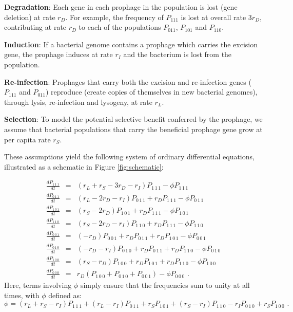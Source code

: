 {\bf Degradation}:  Each gene in each prophage in the population is lost (gene deletion) at rate $r_{D}$. For example, the frequency of $P_{111}$ is lost at overall rate $3r_D$, contributing at rate $r_D$ to each of the populations $P_{011}$, $P_{101}$ and $P_{110}$.

{\bf Induction}: If a bacterial genome contains a prophage which carries the excision gene, the prophage induces at rate $r_I$ and the bacterium is lost from the population.

{\bf Re-infection}:  Prophages that carry both the excision and re-infection genes ($P_{111}$ and $P_{011}$) reproduce (create copies of themselves in new bacterial genomes), through lysis, re-infection and lysogeny, at rate $r_L$.  %
    
{\bf Selection}: To model the potential selective benefit conferred by the prophage, we assume that bacterial populations that carry the beneficial prophage gene grow at per capita rate $r_S$.

These assumptions yield the following system of ordinary differential equations, illustrated as a schematic in Figure \ref{fig:schematic}:

\begin{eqnarray}
\frac{d P_{1\,1\, 1}}{dt} &=& (r_L  +r_{S} - 3 r_{D} - r_{I}) P_{1\,1\, 1} - \phi P_{1\,1\,1} \nonumber\\
\frac{d P_{0\,1\, 1}}{dt} &=& (r_L - 2 r_{D} - r_{I}) P_{0\,1\, 1}+ r_{D}P_{1\, 1\, 1} - \phi P_{0\,1\,1}  \nonumber\\
\frac{d P_{1\,0\, 1}}{dt} &=& (r_{S} - 2 r_{D}) P_{1\,0\, 1} + r_D P_{1\,1\, 1}- \phi P_{1\,0\,1} \nonumber\\
\frac{d P_{1\,1\, 0}}{dt} &=& (r_{S} - 2 r_{D} - r_{I}) P_{1\,1\, 0}+ r_{D} P_{1\,1\, 1} - \phi P_{1\,1\,0}  \nonumber\\
\frac{d P_{0\,0\, 1}}{dt} &=& (- r_{D}) P_{0\,0\, 1} + r_{D} P_{0\,1\, 1} +r_{D} P_{1\,0\, 1}- \phi P_{0\,0\,1} \nonumber\\
\frac{d P_{0\,1\, 0}}{dt} &=& (- r_{D} - r_{I}) P_{0\,1\, 0} + r_{D} P_{0\,1\, 1} +r_{D} P_{1\,1\, 0}- \phi P_{0\,1\,0} \nonumber\\
\frac{d P_{1\,0\, 0}}{dt} &=& (r_{S} - r_{D}) P_{1\,0\, 0}+ r_{D} P_{1\,0\, 1} +r_{D} P_{1\,1\, 0}- \phi P_{1\,0\,0}\nonumber\\
\frac{d P_{0\,0\, 0}}{dt} &=&  r_{D}( P_{1\,0\, 0} + P_{0\,1\, 0} + P_{0\,0\,1})
- \phi P_{0\,0\,0}\,\,.
\label{systemC}
\end{eqnarray} 
Here, terms involving $\phi$ simply ensure that the frequencies sum to unity at all times, with $\phi$ defined as:
\[\phi = (r_L  +r_{S} - r_{I}) P_{1\,1\, 1} +  (r_L - r_{I}) P_{0\,1\, 1} + r_{S} P_{1\,0\, 1} + (r_{S}- r_{I}) P_{1\,1\, 0} - r_{I} P_{0\,1\, 0} + r_{S} P_{1\,0\, 0}\,\,.
\]

